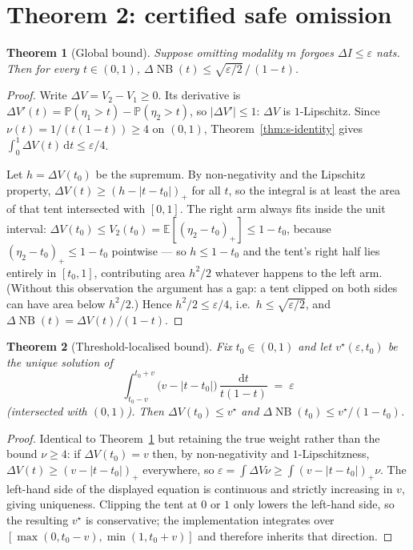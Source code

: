 \documentclass[11pt]{article}
\newtheorem{theorem}{Theorem}
\theoremstyle{definition}
\theoremstyle{remark}
\DeclareMathOperator{\NB}{NB}
\newcommand{\E}{\mathbb{E}}
\newcommand{\Prob}{\mathbb{P}}
\begin{document}
\section{Theorem 2: certified safe omission}
\label{sec:s-omit}
\label{sec:thm2}

\begin{theorem}[Global bound]
\label{thm:s-omit-global}
Suppose omitting modality $m$ forgoes $\Delta I\le\varepsilon$ nats. Then for
every $t\in(0,1)$, $\Delta\NB(t)\le\sqrt{\varepsilon/2}\,/\,(1-t)$.
\end{theorem}

\begin{proof}
Write $\Delta V=V_2-V_1\ge0$. Its derivative is
$\Delta V'(t)=\Prob(\eta_1>t)-\Prob(\eta_2>t)$, so $|\Delta V'|\le1$: $\Delta V$
is $1$-Lipschitz. Since $\nu(t)=1/(t(1-t))\ge4$ on $(0,1)$,
Theorem~\ref{thm:s-identity} gives
$\int_0^1\Delta V(t)\,\mathrm{d}t\le \varepsilon/4$.

Let $h=\Delta V(t_0)$ be the supremum. By non-negativity and the Lipschitz
property, $\Delta V(t)\ge (h-|t-t_0|)_+$ for all $t$, so the integral is at
least the area of that tent intersected with $[0,1]$. The right arm always fits
inside the unit interval: $\Delta V(t_0)\le V_2(t_0)=\E[(\eta_2-t_0)_+]\le 1-t_0$,
because $(\eta_2-t_0)_+\le 1-t_0$ pointwise --- so $h\le 1-t_0$ and the tent's
right half lies entirely in $[t_0,1]$, contributing area $h^2/2$ whatever
happens to the left arm. (Without this observation the argument has a gap: a
tent clipped on both sides can have area below $h^2/2$.) Hence
$h^2/2\le\varepsilon/4$, i.e.\ $h\le\sqrt{\varepsilon/2}$, and
$\Delta\NB(t)=\Delta V(t)/(1-t)$.
\end{proof}

\begin{theorem}[Threshold-localised bound]
\label{thm:s-omit-local}
Fix $t_0\in(0,1)$ and let $v^\star(\varepsilon,t_0)$ be the unique solution of
\[
\int_{t_0-v}^{t_0+v}\big(v-|t-t_0|\big)\,\frac{\mathrm{d}t}{t(1-t)} \;=\; \varepsilon
\]
(intersected with $(0,1)$). Then $\Delta V(t_0)\le v^\star$ and
$\Delta\NB(t_0)\le v^\star/(1-t_0)$.
\end{theorem}

\begin{proof}
Identical to Theorem~\ref{thm:s-omit-global} but retaining the true weight rather
than the bound $\nu\ge4$: if $\Delta V(t_0)=v$ then, by non-negativity and
$1$-Lipschitzness, $\Delta V(t)\ge (v-|t-t_0|)_+$ everywhere, so
$\varepsilon=\int\Delta V\nu\ge\int (v-|t-t_0|)_+\nu$. The left-hand side of the
displayed equation is continuous and strictly increasing in $v$, giving
uniqueness. Clipping the tent at $0$ or $1$ only lowers the left-hand side, so
the resulting $v^\star$ is conservative; the implementation integrates over
$[\max(0,t_0-v),\min(1,t_0+v)]$ and therefore inherits that direction.
\end{proof}
\end{document}
